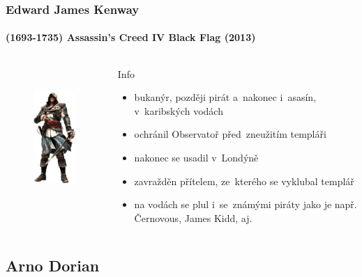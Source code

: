 \documentclass[hyperref={colorlinks, linkcolor=white, urlcolor=green!50!black}]{beamer}
\begin{document}
\begin{frame}\label{edward}
\frametitle{Edward James Kenway}
\framesubtitle{(1693-1735) \hfill Assassin's Creed IV Black Flag (2013)}
\begin{columns}[c]
	
	\begin{figure}[h]
		\centering
		\includegraphics[height=200px]{char_edward}
	\end{figure}
	
	\begin{block}{Info}
	\begin{itemize}
		\item bukanýr, později pirát a~nakonec i~asasín, v~karibských vodách
		\item ochránil Observatoř před~zneužitím templáři
		\item nakonec se usadil v~Londýně
		\item zavražděn přítelem, ze~kterého se vyklubal templář
		\item na vodách se plul i~se~známými piráty jako je např. {\color{darkred} Černovous}, {\color{darkred} James Kidd}, aj.
	\end{itemize}
	\end{block}
	
\end{columns}
\end{frame}

\subsection[Arno]{Arno Dorian}
\end{document}
